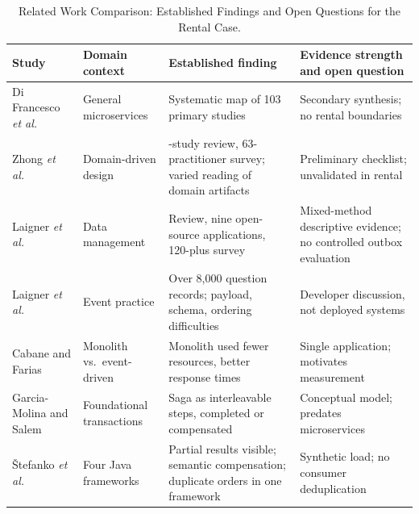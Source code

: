 %
\begin{table}[t]
\caption{Related Work Comparison: Established Findings and Open Questions for the Rental Case.}
\label{tab:related}
\centering\footnotesize
\setlength{\tabcolsep}{3pt}%
\begin{tabularx}{\textwidth}{@{}>{\raggedright\arraybackslash}p{}
                                >{\raggedright\arraybackslash}p{}
                                >{\raggedright\arraybackslash}X
                                >{\raggedright\arraybackslash}X@{}}
\toprule
Study & Domain context & Established finding & Evidence strength and open question \\
\midrule
Di Francesco \textit{et al.}\ \cite{dipfrancesco2019architecting} & General microservices & Systematic map of 103 primary studies & Secondary synthesis; no rental boundaries \\
Zhong \textit{et al.}\ \cite{zhong2024ddd} & Domain-driven design & 34-study review, 63-practitioner survey; varied reading of domain artifacts & Preliminary checklist; unvalidated in rental \\
Laigner \textit{et al.}\ \cite{laigner2021datamanagement} & Data management & Review, nine open-source applications, 120-plus survey & Mixed-method descriptive evidence; no controlled outbox evaluation \\
Laigner \textit{et al.}\ \cite{laigner2026eventmanagement} & Event practice & Over 8,000 question records; payload, schema, ordering difficulties & Developer discussion, not deployed systems \\
Cabane and Farias \cite{cabane2024edaperformance} & Monolith vs.\ event-driven & Monolith used fewer resources, better response times & Single application; motivates measurement \\
Garcia-Molina and Salem \cite{garciamolina1987sagas} & Foundational transactions & Saga as interleavable steps, completed or compensated & Conceptual model; predates microservices \\
\v{S}tefanko \textit{et al.}\ \cite{stefanko2019saga} & Four Java frameworks & Partial results visible; semantic compensation; duplicate orders in one framework & Synthetic load; no consumer deduplication \\

\end{tabularx}
\end{table}
